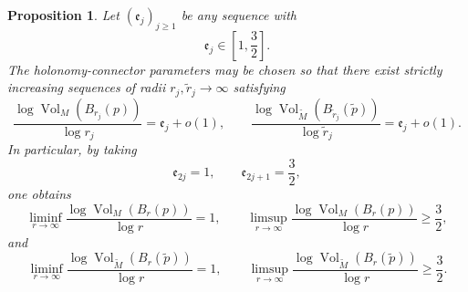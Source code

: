 \documentclass[11pt,reqno]{amsart}
\newtheorem{proposition}[theorem]{Proposition}
\theoremstyle{definition}
\numberwithin{equation}{section}
\begin{document}
\begin{proposition}
\label{prop:volume-growth-flexibility}
Let \((\mathfrak e_j)_{j\ge1}\) be any sequence with
\[
 \mathfrak e_j\in\left[1,\frac32\right].
\]
The holonomy-connector parameters may be chosen so that there exist strictly
increasing sequences of radii \(r_j,\widetilde r_j\to\infty\) satisfying
\[
 \frac{\log\operatorname{Vol}_M(B_{r_j}(p))}{\log r_j}
 =\mathfrak e_j+o(1),
 \qquad
 \frac{\log\operatorname{Vol}_{\widetilde M}
 (B_{\widetilde r_j}(\widetilde p))}
 {\log\widetilde r_j}
 =\mathfrak e_j+o(1).
 \tag{8.19}\label{eq:prescribed-volume-exponents}
\]
In particular, by taking
\[
 \mathfrak e_{2j}=1,
 \qquad
 \mathfrak e_{2j+1}=\frac32,
\]
one obtains
\[
 \liminf_{r\to\infty}
 \frac{\log\operatorname{Vol}_M(B_r(p))}{\log r}=1,
 \qquad
 \limsup_{r\to\infty}
 \frac{\log\operatorname{Vol}_M(B_r(p))}{\log r}
 \ge\frac32,
 \tag{8.20}\label{eq:base-growth-oscillation}
\]
and
\[
 \liminf_{r\to\infty}
 \frac{\log\operatorname{Vol}_{\widetilde M}
 (B_r(\widetilde p))}{\log r}=1,
 \qquad
 \limsup_{r\to\infty}
 \frac{\log\operatorname{Vol}_{\widetilde M}
 (B_r(\widetilde p))}{\log r}
 \ge\frac32.
 \tag{8.21}\label{eq:cover-growth-oscillation}
\]
\end{proposition}
\end{document}

